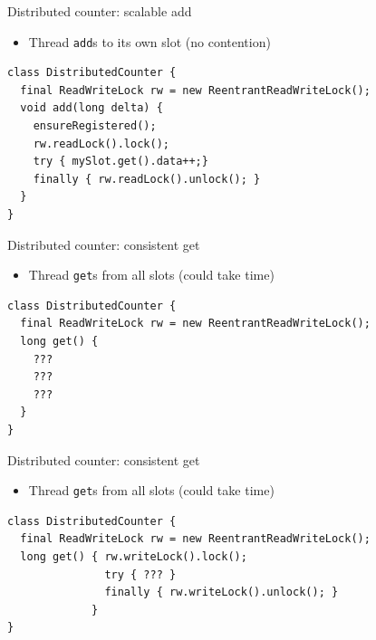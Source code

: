 \begin{frame}{Distributed counter: scalable add}

\begin{itemize}
    \item Thread \texttt{add}s to its own slot (no contention)    
\end{itemize}

\begin{verbatim}
class DistributedCounter {
  final ReadWriteLock rw = new ReentrantReadWriteLock();
  void add(long delta) {
    ensureRegistered();
    rw.readLock().lock();
    try { mySlot.get().data++;} 
    finally { rw.readLock().unlock(); }
  }
}
\end{verbatim}
\end{frame}

\begin{frame}{Distributed counter: consistent get}

\begin{itemize}
    \item Thread \texttt{get}s from all slots (could take time)
\end{itemize}

\begin{verbatim}
class DistributedCounter {
  final ReadWriteLock rw = new ReentrantReadWriteLock();
  long get() {
    ???
    ???
    ???
  }
}
\end{verbatim}
\end{frame}


\begin{frame}{Distributed counter: consistent get}

\begin{itemize}
    \item Thread \texttt{get}s from all slots (could take time)
\end{itemize}

\begin{verbatim}
class DistributedCounter {
  final ReadWriteLock rw = new ReentrantReadWriteLock();
  long get() { rw.writeLock().lock();
               try { ??? } 
               finally { rw.writeLock().unlock(); }
             }
}
\end{verbatim}
\end{frame}

